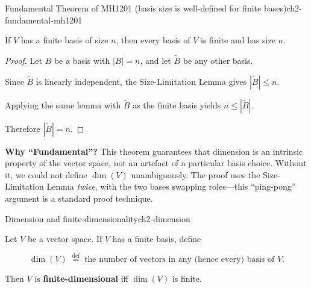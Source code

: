 \begin{theorem}{Fundamental Theorem of MH1201 (basis size is well-defined for finite bases)}{ch2-fundamental-mh1201}

If $V$ has a finite basis of size $n$, then every basis of $V$ is finite and has size $n$.

\begin{proof}

Let $B$ be a basis with $|B|=n$, and let $\widetilde{B}$ be any other basis.

Since $\widetilde{B}$ is linearly independent, the Size-Limitation Lemma gives $|\widetilde{B}|\le n$.

Applying the same lemma with $\widetilde{B}$ as the finite basis yields $n\le |\widetilde{B}|$.

Therefore $|\widetilde{B}|=n$.

\end{proof}

\end{theorem}

\begin{policynote}
\textbf{Why ``Fundamental''?}
This theorem guarantees that dimension is an intrinsic property of the vector space, not an artefact of a particular basis choice.
Without it, we could not define $\dim(V)$ unambiguously.
The proof uses the Size-Limitation Lemma \emph{twice}, with the two bases swapping roles---this ``ping-pong'' argument is a standard proof technique.
\end{policynote}

\begin{definition}{Dimension and finite-dimensionality}{ch2-dimension}

Let $V$ be a vector space. If $V$ has a finite basis, define

\[
\dim(V)\;\stackrel{\mathrm{def}}{=}\;\text{the number of vectors in any (hence every) basis of }V.
\]

Then $V$ is \textbf{finite-dimensional} iff $\dim(V)$ is finite.

\end{definition}

